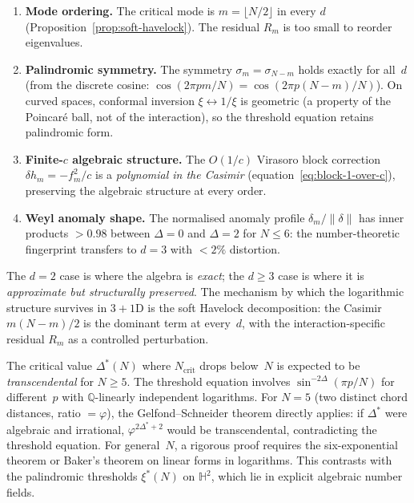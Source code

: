 \begin{enumerate}
\item \textbf{Mode ordering.}
  The critical mode is $m = \lfloor N/2\rfloor$ in every $d$
  (Proposition~\ref{prop:soft-havelock}).
  The residual $R_m$ is too small to reorder eigenvalues.

\item \textbf{Palindromic symmetry.}
  The symmetry $\sigma_m = \sigma_{N-m}$ holds exactly for all~$d$
  (from the discrete cosine: $\cos(2\pi pm/N) = \cos(2\pi p(N{-}m)/N)$).
  On curved spaces, conformal inversion $\xi \leftrightarrow 1/\xi$ is
  geometric (a property of the Poincar\'e ball, not of the interaction),
  so the threshold equation retains palindromic form.

\item \textbf{Finite-$c$ algebraic structure.}
  The $O(1/c)$ Virasoro block correction
  $\delta h_m = -f_m^2/c$ is a \emph{polynomial in the Casimir}
  (equation~\ref{eq:block-1-over-c}),
  preserving the algebraic structure at every order.

\item \textbf{Weyl anomaly shape.}
  The normalised anomaly profile $\delta_m/\|\delta\|$
  has inner products $> 0.98$ between $\Delta = 0$ and
  $\Delta = 2$ for $N \le 6$: the number-theoretic fingerprint
  transfers to $d = 3$ with $< 2\%$ distortion.
\end{enumerate}
The $d = 2$ case is where the algebra is \emph{exact};
the $d \ge 3$ case is where it is \emph{approximate but structurally
preserved}.  The mechanism by which the logarithmic structure
survives in $3{+}1$D is the soft Havelock decomposition:
the Casimir $m(N{-}m)/2$ is the dominant term at every~$d$, with
the interaction-specific residual $R_m$ as a controlled perturbation.

\begin{remark}
\label{rmk:transcendence}
The critical value $\Delta^*(N)$ where $N_{\mathrm{crit}}$ drops
below~$N$ is expected to be \emph{transcendental} for $N \ge 5$.
The threshold equation involves $\sin^{-2\Delta}(\pi p/N)$ for
different~$p$ with $\mathbb{Q}$-linearly independent logarithms.
For $N = 5$ (two distinct chord distances, ratio $= \varphi$),
the Gelfond--Schneider theorem directly applies: if $\Delta^*$
were algebraic and irrational, $\varphi^{2\Delta^*+2}$ would be
transcendental, contradicting the threshold equation.
For general~$N$, a rigorous proof requires the six-exponential
theorem or Baker's theorem on linear forms in logarithms.
This contrasts with the palindromic thresholds $\xi^*(N)$
on $\mathbb{H}^2$, which lie in explicit algebraic number fields.
\end{remark}

